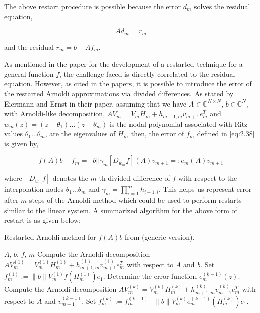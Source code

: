 The above restart procedure is possible because the error $d_{m}$ solves the residual equation,

\begin{equation}
    Ad_{m} = r_{m}
    \label{eq:2.39}
\end{equation}

and the residual $r_{m} = b-Af_{m}$.

As mentioned in the paper \cite{52} for the development of a restarted technique for a general function $f$, the challenge faced is directly correlated to the residual equation. However, as cited in the papers\cite{53, 44}, it is possible to introduce the error of the restarted Arnoldi approximations via divided differences. As stated by Eiermann and Ernst in their paper\cite{44}, assuming that we have $A\in\mathbb{C}^{N \times N}$, $b\in\mathbb{C}^{N}$, with Arnoldi-like decomposition, $AV_{m} = V_{m}H_{m}+h_{m+1,m}v_{m+1}e_{m}^{T}$ and $w_{m}(z) = (z-\theta_{1})\dots(z-\theta_{m})$ is the nodal polynomial associated with Ritz values $\theta_{1}\dots\theta_{m}$, are  the eigenvalues of $H_{m}$ then, the error of $f_{m}$ defined in \ref{eq:2.38} is given by,

\begin{equation}
    f(A)b - f_{m} = ||b|| \gamma_{m} [D_{w_{m}} f](A)v_{m+1} =: e_{m}(A)v_{m+1}
    \label{eq:2.40}
\end{equation}

where $[D_{w_m} f]$ denotes the $m$-th divided difference of $f$ with respect to the interpolation nodes $\theta_{1}\dots\theta_{m}$ and $\gamma_m= \prod_{i=1}^{m}h_{i+1,i}$. This helps us represent error after $m$ steps of the Arnoldi method which could be used to perform restarts similar to the linear system. A summarized algorithm for the above form of restart is as given below:

\begin{algorithm}[H]
    \caption{Restarted Arnoldi method for $f(A)b$ from \cite{52} (generic version).}
    \label{alg:restarted_arnoldi}
    \begin{algorithmic}[1]
    \REQUIRE $A$, $b$, $f$, $m$
    \STATE Compute the Arnoldi decomposition $AV^{(1)}_m = V^{(1)}_m H^{(1)}_m + h^{(1)}_{m+1,m} v^{(1)}_{m+1} e_m^T$ with respect to $A$ and $b$.
    \STATE Set $f^{(1)}_m := \|b\|V^{(1)}_m f(H^{(1)}_m) e_1$.
        \STATE Determine the error function $e^{(k-1)}_m(z)$.
        \STATE Compute the Arnoldi decomposition $AV^{(k)}_m = V^{(k)}_m H^{(k)}_m + h^{(k)}_{m+1,m} v^{(k)}_{m+1} e_m^T$ with respect to $A$ and $v^{(k-1)}_{m+1}$.
        \STATE Set $f^{(k)}_m := f^{(k-1)}_m + \|b\|V^{(k)}_m e^{(k-1)}_m (H^{(k)}_m) e_1$.
    \ENDFOR
    \end{algorithmic}
\end{algorithm}

